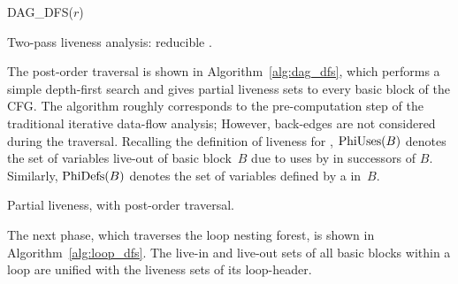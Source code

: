 \medskip
\begin{algorithm}[H]
      {DAG\_DFS}($r$) 
    \caption{Two-pass liveness analysis: reducible \@CFG.}
  \label{alg:twopass}
\end{algorithm}
\medskip

The post-order traversal is shown in Algorithm~\ref{alg:dag_dfs}, which performs a simple depth-first search and gives partial liveness sets to every basic block of the CFG.
The algorithm roughly corresponds to the pre-computation step of the traditional iterative data-flow analysis;
However, back-edges are not considered during the traversal.
Recalling the definition of liveness for \phifuns, $\textrm{PhiUses}(B)$ denotes the set of variables live-out of basic block~$B$ due to uses by \phifuns in successors of $B$.
Similarly, $\textrm{PhiDefs}(B)$ denotes the set of variables defined by a \phifun in~$B$.

\medskip
\begin{algorithm}[H]
  \caption{Partial liveness, with post-order traversal.}
  \label{alg:dag_dfs}
\end{algorithm}
\medskip

The next phase, which traverses the loop nesting forest, is shown in Algorithm~\ref{alg:loop_dfs}.
The live-in and live-out sets of all basic blocks within a loop are unified with the liveness sets of its loop-header.

